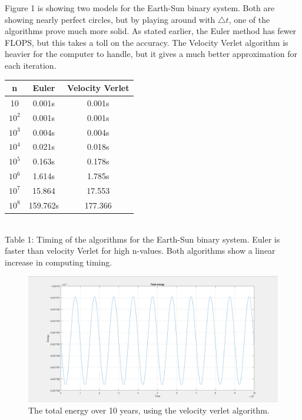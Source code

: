 \documentclass[10pt,a4paper]{article}
\begin{document}
\noindent Figure 1 is showing  two models for the Earth-Sun binary system. Both are showing nearly perfect circles, but by playing around with $\bigtriangleup t$, one of the algorithms prove much more solid. As stated earlier, the Euler method has fewer FLOPS, but this takes a toll on the accuracy. The Velocity Verlet algorithm is heavier for the computer to handle, but it gives a much better approximation for each iteration. \\ 

\begin{center}
\begin{tabular}{|c|c|c|}
\hline
  n  & Euler & Velocity Verlet\\
\hline
10        & 0.001s & 0.001s \\
\hline
$10^2$      & 0.001s & 0.001s \\
\hline
$10^3$      & 0.004s & 0.004s \\
\hline
$10^4$      & 0.021s & 0.018s \\
\hline
$10^5$      & 0.163s & 0.178s \\
\hline
$10^6$      & 1.614s & 1.785s \\
\hline
$10^7$      & 15.864 & 17.553 \\
\hline
$10^8$      & 159.762s & 177.366  \\
\hline
\end{tabular}\\
Table 1: Timing of the algorithms for the Earth-Sun binary system. Euler is faster than velocity Verlet for high n-values. Both algorithms show a linear increase in computing timing. 
\end{center}



\begin{figure} [H]

\centerline{\includegraphics[scale=0.20]{TotalEnergyVerlet.png}}
\caption{The total energy over 10 years, using the velocity verlet algorithm. }


\end{figure}
\end{document}
